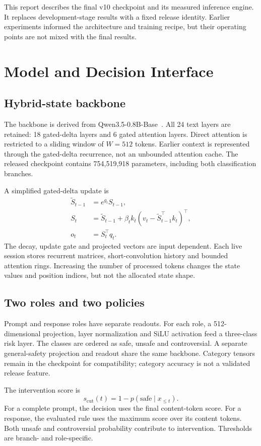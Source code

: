 \documentclass[11pt]{article}
\begin{document}
This report describes the final v10 checkpoint and its measured inference engine. It replaces development-stage results with a fixed release identity. Earlier experiments informed the architecture and training recipe, but their operating points are not mixed with the final results.

\section{Model and Decision Interface}
\subsection{Hybrid-state backbone}
The backbone is derived from Qwen3.5-0.8B-Base~\cite{qwen35}. All 24 text layers are retained: 18 gated-delta layers and 6 gated attention layers. Direct attention is restricted to a sliding window of $W=512$ tokens. Earlier context is represented through the gated-delta recurrence, not an unbounded attention cache. The released checkpoint contains 754,519,918 parameters, including both classification branches.

A simplified gated-delta update is
\begin{align}
\widetilde{S}_{t-1} &= e^{g_t}S_{t-1},\\
S_t &= \widetilde{S}_{t-1}+\beta_t k_t\left(v_t-\widetilde{S}_{t-1}^{\top}k_t\right)^{\top},\\
o_t &= S_t^{\top}q_t.
\end{align}
The decay, update gate and projected vectors are input dependent. Each live session stores recurrent matrices, short-convolution history and bounded attention rings. Increasing the number of processed tokens changes the state values and position indices, but not the allocated state shape.

\subsection{Two roles and two policies}
Prompt and response roles have separate readouts. For each role, a 512-dimensional projection, layer normalization and SiLU activation feed a three-class risk layer. The classes are ordered as safe, unsafe and controversial. A separate general-safety projection and readout share the same backbone. Category tensors remain in the checkpoint for compatibility; category accuracy is not a validated release feature.

The intervention score is
\begin{equation}
s_{\mathrm{cut}}(t)=1-p(\mathrm{safe}\mid x_{\leq t}).
\end{equation}
For a complete prompt, the decision uses the final content-token score. For a response, the evaluated rule uses the maximum score over its content tokens. Both unsafe and controversial probability contribute to intervention. Thresholds are branch- and role-specific.
\end{document}
